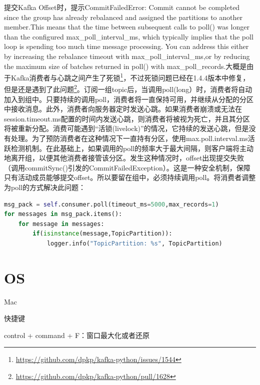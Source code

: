 \documentclass[8pt]{book}
\makeatletter
\numberwithin{dummy}{section}
\theoremstyle{ocrenumbox}
\theoremstyle{blacknumex}
\theoremstyle{blacknumbox}
\theoremstyle{ocrenum}
\renewcommand{\section}{\@startsection{section}{1}{\z@}
	{-4ex \@plus -1ex \@minus -.4ex}
	{1ex \@plus.2ex }
	{\normalfont\large\sffamily\bfseries}}
\renewcommand{\subsection}{\@startsection {subsection}{2}{\z@}
	{-3ex \@plus -0.1ex \@minus -.4ex}
	{0.5ex \@plus.2ex }
	{\normalfont\sffamily\bfseries}}
\makeatother
\begin{document}
提交Kafka Offset时，提示CommitFailedError: Commit cannot be completed since the group has already rebalanced and assigned the partitions to another member.This means that the time between subsequent calls to poll() was longer than the configured max\_poll\_interval\_ms, which typically implies that the poll loop is spending too much time message processing. You can address this either by increasing the rebalance timeout with max\_poll\_interval\_ms,or by reducing the maximum size of batches returned in poll() with max\_poll\_records.大概是由于Kafka消费者与心跳之间产生了死锁\footnote{\url{https://github.com/dpkp/kafka-python/issues/1544}}，不过死锁问题已经在1.4.4版本中修复，但是还是遇到了此问题\footnote{\url{https://github.com/dpkp/kafka-python/pull/1628}}。订阅一组topic后，当调用poll(long）时，消费者将自动加入到组中。只要持续的调用poll，消费者将一直保持可用，并继续从分配的分区中接收消息。此外，消费者向服务器定时发送心跳。如果消费者崩溃或无法在session.timeout.ms配置的时间内发送心跳，则消费者将被视为死亡，并且其分区将被重新分配。消费可能遇到“活锁(livelock)”的情况，它持续的发送心跳，但是没有处理。为了预防消费者在这种情况下一直持有分区，使用max.poll.interval.ms活跃检测机制。在此基础上，如果调用的poll的频率大于最大间隔，则客户端将主动地离开组，以便其他消费者接管该分区。发生这种情况时，offset出现提交失败（调用commitSync()引发的CommitFailedException）。这是一种安全机制，保障只有活动成员能够提交offset。所以要留在组中，必须持续调用poll。将消费者调整为poll的方式解决此问题：

\begin{lstlisting}[language=Python]
msg_pack = self.consumer.poll(timeout_ms=5000,max_records=1)
for messages in msg_pack.items():
    for message in messages:
        if(isinstance(message,TopicPartition)):
            logger.info("TopicPartition: %s", TopicPartition)
\end{lstlisting}

\chapter{OS}

\section{Mac}

\subsection{快捷键}

control + command + F：窗口最大化或者还原
\end{document}
